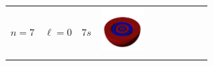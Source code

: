 \begin{landscape}
\begin{xltabular}{\linewidth}{C C C c c c c c c c}
\midrule

 &  &  & 
\includegraphics[width=1.6cm]{tableau_geometrie_orbitale_modelisation/S7M0.png} 
& & & & & & \\

& & &  & & & & & &  \\ %

\bottomrule

\end{xltabular}
\end{landscape}


